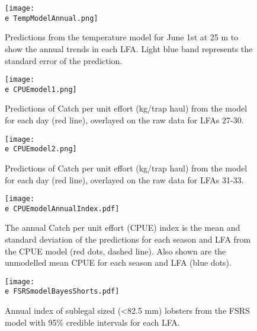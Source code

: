 \documentclass[11pt]{article}
\newcommand{\e}{\string~/bio.data/bio.lobster/figures/LFA2733Framework2018/} %
\begin{document}
    \begin{figure}
    \centering
        \texttt{[image: \\e TempModelAnnual.png]}
        \caption{Predictions from the temperature model for June 1st at 25 m to show the annual trends in each LFA. Light blue band represents the standard error of the prediction.}

    \end{figure}


    \begin{figure}
    \centering
        \texttt{[image: \\e CPUEmodel1.png]}
        \caption{Predictions of Catch per unit effort (kg/trap haul) from the model for each day (red line), overlayed on the raw data for LFAs 27-30. }

    \end{figure}


    \begin{figure}
    \centering
        \texttt{[image: \\e CPUEmodel2.png]}
        \caption{Predictions of Catch per unit effort (kg/trap haul) from the model for each day (red line), overlayed on the raw data for LFAs 31-33.}

    \end{figure}

    \begin{figure}
    \centering
        \texttt{[image: \\e CPUEmodelAnnualIndex.pdf]}
        \caption{The annual Catch per unit effort (CPUE) index is the mean and standard deviation of the predictions for each season and LFA from the CPUE model (red dots, dashed line). Also shown are the unmodelled mean CPUE for each season and LFA (blue dots).}

    \end{figure}




    \begin{figure}
    \centering
        \texttt{[image: \\e FSRSmodelBayesShorts.pdf]}
        \caption{Annual index of sublegal sized (<82.5 mm) lobsters from the FSRS model with 95\% credible intervals for each LFA.}

    \end{figure}
\end{document}
